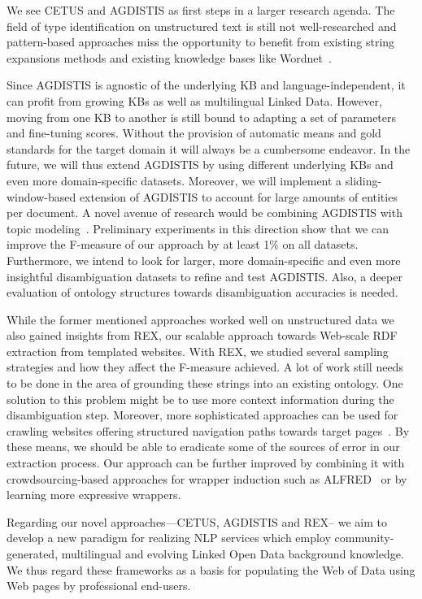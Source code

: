 We see CETUS and AGDISTIS as first steps in a larger research agenda.
The field of type identification on unstructured text is still not well-researched and pattern-based approaches miss the opportunity to benefit from existing string expansions methods and existing knowledge bases like Wordnet~\cite{wordnet}.


Since AGDISTIS is agnostic of the underlying \ac{KB} and language-independent, it can profit from growing \ac{KB}s as well as multilingual Linked Data.
However, moving from one \ac{KB} to another is still bound to adapting a set of parameters and fine-tuning scores. 
Without the provision of automatic means and gold standards for the target domain it will always be a cumbersome endeavor. 
In the future, we will thus extend AGDISTIS by using different underlying \ac{KB}s and even more domain-specific datasets.
Moreover, we will implement a sliding-window-based extension of AGDISTIS to account for large amounts of entities per document.
A novel avenue of research would be combining AGDISTIS with topic modeling~\cite{Blei:2003:LDA:944919.944937}. 
Preliminary experiments in this direction show that we can improve the F-measure of our approach by at least 1\% on all datasets.
Furthermore, we intend to look for larger, more domain-specific and even more insightful disambiguation datasets to refine and test AGDISTIS.
Also, a deeper evaluation of ontology structures towards disambiguation accuracies is needed.

While the former mentioned approaches worked well on unstructured data we also gained insights from REX, our scalable approach towards Web-scale RDF extraction from templated websites. 
With REX, we studied several sampling strategies and how they affect the F-measure achieved.
A lot of work still needs to be done in the area of grounding these strings into an existing ontology.
One solution to this problem might be to use more context information during the disambiguation step.
Moreover, more sophisticated approaches can be used for crawling websites offering structured navigation paths towards target pages~\cite{DBLP:conf/webist/BlancoCM05}. 
By these means, we should be able to eradicate some of the sources of error in our extraction process. 
Our approach can be further improved by combining it with crowdsourcing-based approaches for wrapper induction such as ALFRED~\cite{Crescenzi2013} or by learning more expressive wrappers.


Regarding our novel approaches---CETUS, AGDISTIS and REX-- we aim to develop a new paradigm for realizing \ac{NLP} services which employ community-generated, multilingual and evolving Linked Open Data background knowledge.
We thus regard these frameworks as a basis for populating the Web of Data using Web pages by professional end-users.


